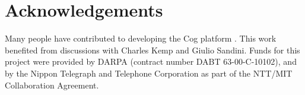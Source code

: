 
\iflong
\section*{Acknowledgements}
\else
\begin{Acknowledgment}
\fi

Many people have contributed to developing the Cog platform
\cite{brooks99cog}.  This work benefited from discussions with Charles Kemp
and Giulio Sandini.  Funds for this project were provided by DARPA 
(contract number DABT 63-00-C-10102), and by the
Nippon Telegraph and Telephone Corporation as part of the NTT/MIT
Collaboration Agreement.

\iflong
\else
\end{Acknowledgment}
\fi
